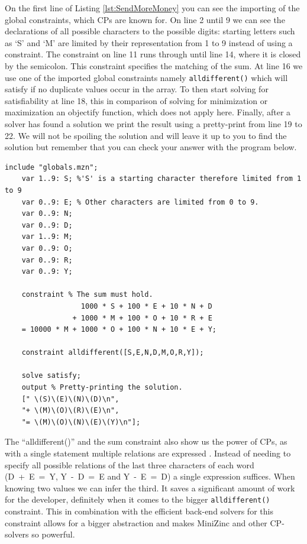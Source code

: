 \label{sendMoreMoneyExplanation}
On the first line of Listing \ref{lst:SendMoreMoney} you can see the importing of the global constraints, which CPs are known for. On line 2 until 9 we can see the declarations of all possible characters to the possible digits: starting letters such as ‘S’ and ‘M’ are limited by their representation from 1 to 9 instead of using a constraint. The constraint on line 11 runs through until line 14, where it is closed by the semicolon. This constraint specifies the matching of the sum. At line 16 we use one of the imported global constraints namely \texttt{alldifferent()} which will satisfy if no duplicate values occur in the array. To then start solving for satisfiability at line 18, this in comparison of solving for minimization or maximization an objectify function, which does not apply here. Finally, after a solver has found a solution we print the result using a pretty-print from line 19 to 22.
We will not be spoiling the solution and will leave it up to you to find the solution but remember that you can check your answer with the program below.

\begin{minipage}{0.948\textwidth}
\begin{lstlisting}[language=minizinc, label={lst:SendMoreMoney}, caption={Solution to the puzzle “send more money” modified and taken from \url{https://www.minizinc.org/doc-2.5.5/en/downloads/send-more-money.mzn}.}]
	include "globals.mzn";
	var 1..9: S; %'S' is a starting character therefore limited from 1 to 9
	var 0..9: E; % Other characters are limited from 0 to 9.
	var 0..9: N;
	var 0..9: D;
	var 1..9: M;
	var 0..9: O;
	var 0..9: R;
	var 0..9: Y;
	
	constraint % The sum must hold.
                  1000 * S + 100 * E + 10 * N + D
                + 1000 * M + 100 * O + 10 * R + E
    = 10000 * M + 1000 * O + 100 * N + 10 * E + Y;
	
	constraint alldifferent([S,E,N,D,M,O,R,Y]);
	
	solve satisfy;
	output % Pretty-printing the solution.
	[" \(S)\(E)\(N)\(D)\n",
	"+ \(M)\(O)\(R)\(E)\n",
	"= \(M)\(O)\(N)\(E)\(Y)\n"];
\end{lstlisting}
\end{minipage}


The “alldifferent()” and the sum constraint also show us the power of CPs, as with a single statement multiple relations are expressed \cite{53marriott1998programming}. Instead of needing to specify all possible relations of the last three characters of each word (\mbox{D + E = Y}, \mbox{Y - D = E} and \mbox{Y - E = D}) a single expression suffices. When knowing two values we can infer the third. It saves a significant amount of work for the developer, definitely when it comes to the bigger \texttt{alldifferent()} constraint. This in combination with the efficient back-end solvers for this constraint allows for a bigger abstraction and makes MiniZinc and other CP-solvers so powerful.

